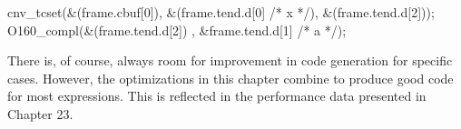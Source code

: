 \goodbreak
\begin{iconcode}
\>\>cnv\_tcset(\&(frame.cbuf[0]), \&(frame.tend.d[0] /* x */), \&(frame.tend.d[2]));\\
\>\>O160\_compl(\&(frame.tend.d[2]) , \&frame.tend.d[1] /* a */);\\
\end{iconcode}

There is, of course, always room for improvement in code generation
for specific cases. However, the optimizations in this chapter combine
to produce good code for most expressions. This is reflected in the
performance data presented in Chapter 23.

